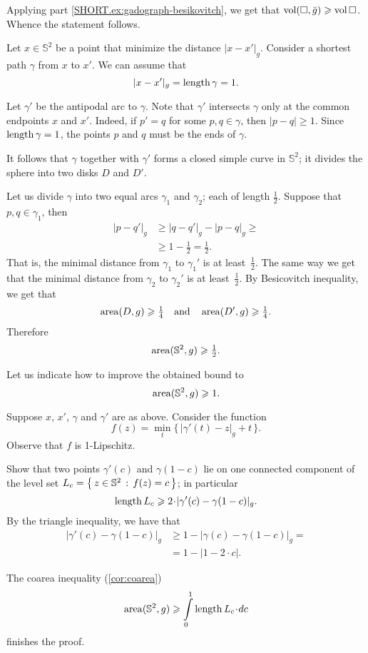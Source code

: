Applying part \ref{SHORT.ex:gadograph-besikovitch}, we get that $\vol(\square,\bar g)\z\ge \vol\square$.
Whence the statement follows.


Let $x\in \mathbb{S}^2$ be a point that minimize the distance $|x-x'|_g$.
Consider a shortest path $\gamma$ from $x$ to $x'$.
We can assume that 
\[|x-x'|_g=\mathop{\rm length}\nolimits \gamma=1.\]

Let $\gamma'$ be the antipodal arc to $\gamma$.
Note that $\gamma'$ intersects $\gamma$ only at the common endpoints $x$ and $x'$.
Indeed, if $p'=q$ for some $p,q\in\gamma$, then $|p-q|\ge 1$.
Since $\mathop{\rm length}\nolimits \gamma=1$, the points $p$ and $q$ must be the ends of $\gamma$.

It follows that $\gamma$ together with $\gamma'$ forms a closed simple curve in $\mathbb{S}^2$;
it divides the sphere into two disks $D$ and $D'$.

Let us divide $\gamma$ into two equal arcs $\gamma_1$ and $\gamma_2$; each of length $\tfrac12$.
Suppose that $p,q\in\gamma_1$, then 
\begin{align*}
|p-q'|_g&\ge |q-q'|_g-|p-q|_g\ge
\\
&\ge 1-\tfrac12=\tfrac12.
\end{align*}
That is, the minimal distance from $\gamma_1$ to $\gamma_1'$ is at least~$\tfrac12$.
The same way we get that the minimal distance from $\gamma_2$ to $\gamma_2'$ is at least~$\tfrac12$.
By Besicovitch inequality, we get that 
\[\operatorname{\rm area}\nolimits(D,g)\geqslant \tfrac14\quad\text{and}\quad \operatorname{\rm area}\nolimits(D',g)\geqslant \tfrac14.\]
Therefore 
\[\operatorname{\rm area}\nolimits(\mathbb{S}^2,g)\geqslant\tfrac12.\]

Let us indicate how to improve the obtained bound to
\[\operatorname{\rm area}\nolimits(\mathbb{S}^2,g)\geqslant1.\]

Suppose $x$, $x'$, $\gamma$ and $\gamma'$ are as above.
Consider the function
\[f(z)=\min_t \{\,|\gamma'(t)-z|_g+t\,\}.\]
Observe that $f$ is 1-Lipschitz.

Show that two points $\gamma'(c)$ and $\gamma(1-c)$ lie on one connected component of the level set $L_c=\left\{\,{z\in\mathbb{S}^2}\,:\,{f(z)=c}\,\right\}$;
in particular 
\[\length L_c\ge 2\cdot|\gamma'(c)-\gamma(1-c)|_g.\]
By the triangle inequality, we have that
\begin{align*}
|\gamma'(c)-\gamma(1-c)|_g&\ge 1-|\gamma(c)-\gamma(1-c)|_g=
\\
&=1-|1-2\cdot c|.
\end{align*}

The coarea inequality (\ref{cor:coarea})
\[\area(\mathbb{S}^2,g)\ge \int\limits_0^1\length L_c\cdot dc\]
finishes the proof.


